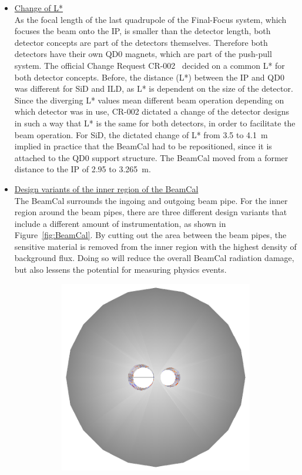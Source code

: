 \begin{itemize}
 \item \underline{Change of L*}\\
 As the focal length of the last quadrupole of the Final-Focus system, which focuses the beam onto the IP, is smaller than the detector length, both detector concepts are part of the detectors themselves.
 Therefore both detectors have their own QD0 magnets, which are part of the push-pull system.
 The official Change Request CR-002~\cite{CR-002} decided on a common L* for both detector concepts.
 Before, the distance (L*) between the IP and QD0 was different for SiD and ILD, as L* is dependent on the size of the detector.
 Since the diverging L* values mean different beam operation depending on which detector was in use, CR-002 dictated a change of the detector designs in such a way that L* is the same for both detectors, in order to facilitate the beam operation.
 For SiD, the dictated change of L* from 3.5 to \SI{4.1}{\meter} implied in practice that the BeamCal had to be repositioned, since it is attached to the QD0 support structure. 
 The BeamCal moved from a former distance to the IP of 2.95 to \SI{3.265}{\meter}.~\cite{SiDBkgNote}
 \item \underline{Design variants of the inner region of the BeamCal}\\
 The BeamCal surrounds the ingoing and outgoing beam pipe.
 For the inner region around the beam pipes, there are three different design variants that include a different amount of instrumentation, as shown in Figure~\ref{fig:BeamCal}.
 By cutting out the area between the beam pipes, the sensitive material is removed from the inner region with the highest density of background flux.
 Doing so will reduce the overall BeamCal radiation damage, but also lessens the potential for measuring physics events.
 \begin{figure}
 \centering
  \begin{subfigure}[b]{0.3\textwidth}
   \centering
    \includegraphics[width=\textwidth]{Figures/beamcal_plug.png}

\end{subfigure}
\end{figure}
\end{itemize}
